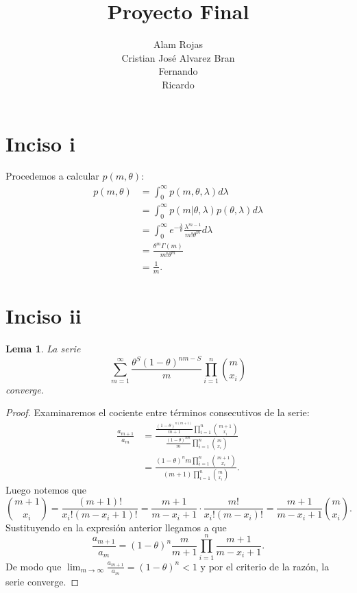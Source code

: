 \documentclass[12 pt]{article}
\title{Proyecto Final}
\author{Alam Rojas\\
Cristian José Alvarez Bran \\
Fernando\\
Ricardo 
}
\date{}
\newtheorem{lema}{Lema}
\begin{document}
\maketitle



\section{Inciso i}
Procedemos a calcular $p(m,\theta)$: 
\begin{align*}
    p(m, \theta) &= \int_{0}^{\infty}p(m, \theta , \lambda)d\lambda\\
    &= \int_{0}^{\infty}p(m|\theta, \lambda)p(\theta, \lambda) d\lambda\\
    &= \int_{0}^{\infty}e^{-\frac{\lambda}{\theta}}\frac{\lambda^{m-1}}{m!\theta^m} d\lambda\\
    &=\frac{\theta^m\Gamma(m)}{m!\theta^m}\\
    &= \frac{1}{m}.
\end{align*}

\section{Inciso ii}

\begin{lema}
La serie 
\begin{equation*}
    \sum_{m=1}^{\infty}\frac{\theta^S(1-\theta)^{nm-S}}{m}\prod_{i=1}^{n}{{m}\choose{x_i}}
\end{equation*}
converge.
\end{lema}
\begin{proof}
Examinaremos el cociente entre términos consecutivos de la serie:
\begin{align*}
    \frac{a_{m+1}}{a_m} &=  
    \frac{\frac{(1-\theta)^{n(m+1)}}{m+1}\prod_{i=1}^{n}{{m+1}\choose{x_i}}}{ \frac{(1-\theta)^{nm}}{m}\prod_{i=1}^{n}{{m}\choose{x_i}}}\\
    &= \frac{(1-\theta)^{n}m\prod_{i=1}^{n}{{m+1}\choose{x_i}}}{(m+1)\prod_{i=1}^{n}{{m}\choose{x_i}}}.
\end{align*}
Luego notemos que 
\begin{equation*}
    {{m+1}\choose{x_i}} = \frac{(m+1)!}{x_i!(m-x_i+1)!} =  \frac{m+1}{m-x_i+1}\cdot\frac{m!}{x_i!(m-x_i)!} = \frac{m+1}{m-x_i+1}{{m}\choose{x_i}}.
\end{equation*}
Sustituyendo en la expresión anterior llegamos a que 
\begin{equation}
    \frac{a_{m+1}}{a_m} = (1-\theta)^n\frac{m}{m+1}\prod_{i=1}^{n} \frac{m+1}{m-x_i+1}.
\end{equation}
De modo que $\lim_{m\to \infty} \frac{a_{m+1}}{a_m} = (1-\theta)^n < 1$ y por el criterio de la razón, la serie converge.
\end{proof}
\end{document}
